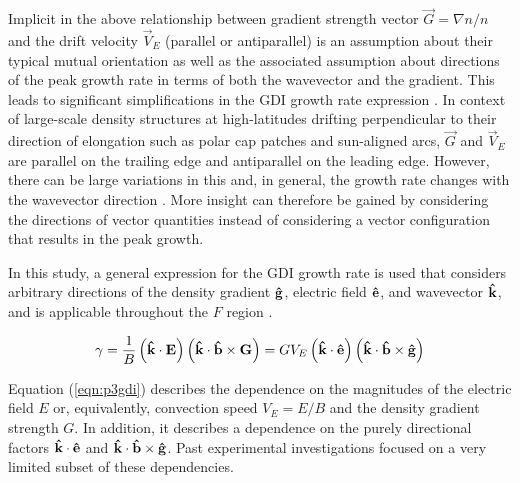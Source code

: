 Implicit in the above relationship  between gradient strength vector \(\vec{G} = \nabla n/n\) and the drift velocity \(\vec{V}_E\) (parallel or antiparallel) is an assumption about their typical mutual orientation as well as the associated assumption about directions of the peak growth rate in terms of both the wavevector and the gradient. This leads to significant simplifications in the GDI growth rate expression \citep{Linson1970,Tsunoda1988}. In context of large-scale density structures at high-latitudes drifting perpendicular to their direction of elongation \citep{Makarevitch2004c,Makarevich2015b} such as polar cap patches and sun-aligned arcs, \(\vec{G}\) and \(\vec{V}_E\) are parallel on the trailing edge and antiparallel on the leading edge. However, there can be large variations in this \citep{Makarevitch2004c} and, in general, the growth rate changes with the wavevector direction \citep{Keskinen1982,Keskinen1983b,Makarevich2014c}. More insight can therefore be gained by considering the directions of vector quantities instead of considering a vector configuration that results in the peak growth.

In this study, a general expression for the GDI growth rate is used that considers arbitrary directions of the density gradient \(\mathbf{\hat{g}}\), electric field \(\mathbf{\hat{e}}\), and wavevector \(\mathbf{\hat{k}}\), and is applicable throughout the \(F\) region \citep[Equation 23]{Makarevich2014c}.

\begin{equation}
  \label{eqn:p3gdi}
  \gamma = \frac{1}{B}\left(\mathbf{\hat{k}}\cdot\mathbf{E}\right)\left(\mathbf{\hat{k}}\cdot\mathbf{\hat{b}}\times\mathbf{G}\right) = GV_E\left(\mathbf{\hat{k}}\cdot\mathbf{\hat{e}}\right)\left(\mathbf{\hat{k}}\cdot\mathbf{\hat{b}}\times\mathbf{\hat{g}}\right)
\end{equation}

Equation (\ref{eqn:p3gdi}) describes the dependence on the magnitudes of the electric field $E$ or, equivalently, convection speed \(V_E=E/B\) and the density gradient strength \(G\). In addition, it describes a dependence on the purely directional factors \(\mathbf{\hat{k}}\cdot\mathbf{\hat{e}}\) and \(\mathbf{\hat{k}}\cdot\mathbf{\hat{b}}\times\mathbf{\hat{g}}\). Past experimental investigations focused on a very limited subset of these dependencies.


